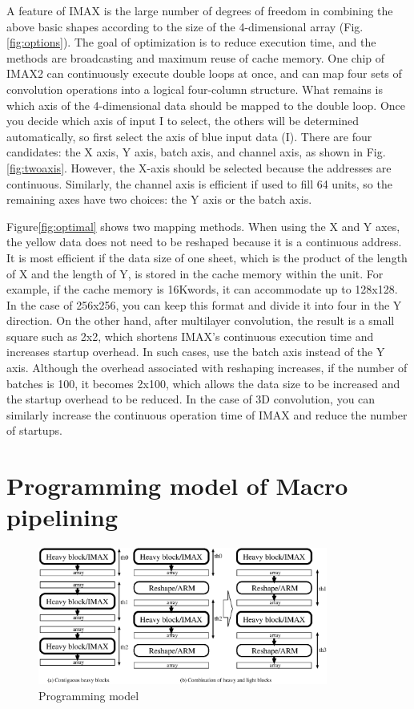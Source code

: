 A feature of IMAX is the large number of degrees of freedom in combining the
above basic shapes according to the size of the 4-dimensional array
(Fig.\ref{fig:options}). The goal of optimization is to reduce execution
time, and the methods are broadcasting and maximum reuse of cache
memory. One chip of IMAX2 can continuously execute double loops at once, and
can map four sets of convolution operations into a logical four-column
structure. What remains is which axis of the 4-dimensional data should be
mapped to the double loop. Once you decide which axis of input I to select,
the others will be determined automatically, so first select the axis of
blue input data (I). There are four candidates: the X axis, Y axis, batch
axis, and channel axis, as shown in Fig.\ref{fig:twoaxis}. However, the
X-axis should be selected because the addresses are continuous. Similarly,
the channel axis is efficient if used to fill 64 units, so the remaining
axes have two choices: the Y axis or the batch axis.

Figure\ref{fig:optimal} shows two mapping methods. When using the X and Y
axes, the yellow data does not need to be reshaped because it is a
continuous address. It is most efficient if the data size of one sheet,
which is the product of the length of X and the length of Y, is stored in
the cache memory within the unit. For example, if the cache memory is
16Kwords, it can accommodate up to 128x128. In the case of 256x256, you can
keep this format and divide it into four in the Y direction. On the other
hand, after multilayer convolution, the result is a small square such as
2x2, which shortens IMAX's continuous execution time and increases startup
overhead. In such cases, use the batch axis instead of the Y axis. Although
the overhead associated with reshaping increases, if the number of batches
is 100, it becomes 2x100, which allows the data size to be increased and the
startup overhead to be reduced. In the case of 3D convolution, you can
similarly increase the continuous operation time of IMAX and reduce the
number of startups.

\section{Programming model of Macro pipelining}

\begin{figure}[htbp]
\center
\includegraphics[angle=0,origin=b,width=0.85\textwidth]{macro-pipe.eps}
\caption{\label{fig:model0}Programming model}
\end{figure}

